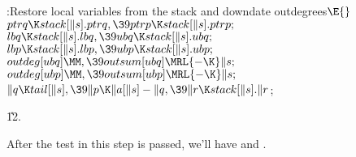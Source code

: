 \B{}:Restore local variables from the stack and downdate
outdegrees\X${}\E{}$\6
$\\{ptrq}\K\\{stack}[\|s].\\{ptrq},\39\\{ptrp}\K\\{stack}[\|s].\\{ptrp};{}$\6
${}\\{lbq}\K\\{stack}[\|s].\\{lbq},\39\\{ubq}\K\\{stack}[\|s].\\{ubq};{}$\6
${}\\{lbp}\K\\{stack}[\|s].\\{lbp},\39\\{ubp}\K\\{stack}[\|s].\\{ubp};{}$\6
${}\\{outdeg}[\\{ubq}]\MM,\39\\{outsum}[\\{ubq}]\MRL{-{\K}}\|s;{}$\6
${}\\{outdeg}[\\{ubp}]\MM,\39\\{outsum}[\\{ubp}]\MRL{-{\K}}\|s;{}$\6
${}\|q\K\\{tail}[\|s],\39\|p\K\|a[\|s]-\|q,\39\|r\K\\{stack}[\|s].\|r{}$;\par
\U12.\fi

After the test in this step is passed, we'll have  and .

